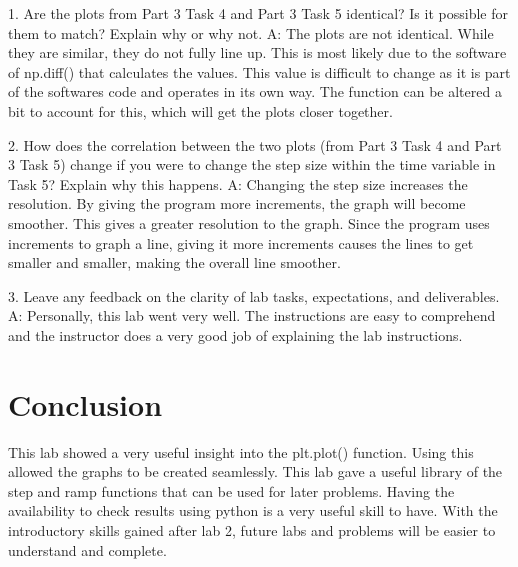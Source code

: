 \documentclass[12pt]{report}
\begin{document}
1. Are the plots from Part 3 Task 4 and Part 3 Task 5 identical? Is it possible for them to match? Explain why or why not.
	A: The plots are not identical. While they are similar, they do not fully line up. This is most likely due to the software of np.diff() that calculates the values. This value is difficult to change as it is part of the softwares code and operates in its own way. The function can be altered a bit to account for this, which will get the plots closer together.
	
2. How does the correlation between the two plots (from Part 3 Task 4 and Part 3 Task 5) change if you were to change the step size within the time variable in Task 5? Explain why this happens.
	A: Changing the step size increases the resolution. By giving the program more increments, the graph will become smoother. This gives a greater resolution to the graph. Since the program uses increments to graph a line, giving it more increments causes the lines to get smaller and smaller, making the overall line smoother.
	
3. Leave any feedback on the clarity of lab tasks, expectations, and deliverables.
	A: Personally, this lab went very well. The instructions are easy to comprehend and the instructor does a very good job of explaining the lab instructions.

\section{Conclusion}

This lab showed a very useful insight into the plt.plot() function. Using this allowed the graphs to be created seamlessly. This lab gave a useful library of the step and ramp functions that can be used for later problems. Having the availability to check results using python is a very useful skill to have. With the introductory skills gained after lab 2, future labs and problems will be easier to understand and complete.
\end{document}
